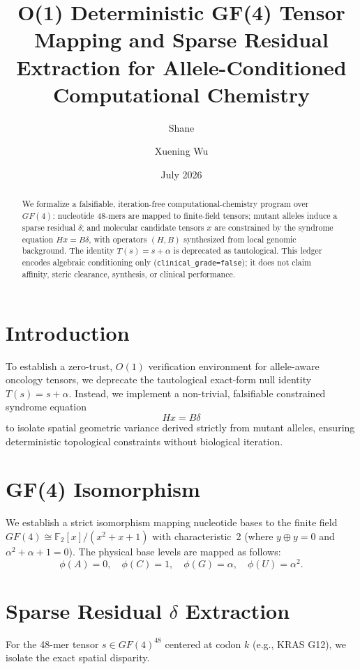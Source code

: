 \documentclass[11pt]{article}
\title{O(1) Deterministic GF(4) Tensor Mapping and Sparse Residual\\
Extraction for Allele-Conditioned Computational Chemistry}
\author{Shane \and Xuening Wu}
\date{July 2026}
\begin{document}
\maketitle

\begin{abstract}
We formalize a falsifiable, iteration-free computational-chemistry program
over \(GF(4)\): nucleotide 48-mers are mapped to finite-field tensors;
mutant alleles induce a sparse residual \(\delta\); and molecular candidate
tensors \(x\) are constrained by the syndrome equation \(Hx=B\delta\), with
operators \((H,B)\) synthesized from local genomic background. The identity
\(T(s)=s+\alpha\) is deprecated as tautological. This ledger encodes algebraic
conditioning only (\texttt{clinical\_grade=false}); it does not claim affinity,
steric clearance, synthesis, or clinical performance.
\end{abstract}

\section{Introduction}
To establish a zero-trust, \(O(1)\) verification environment for allele-aware
oncology tensors, we deprecate the tautological exact-form null identity
\(T(s)=s+\alpha\). Instead, we implement a non-trivial, falsifiable constrained
syndrome equation
\begin{equation}
  Hx = B\delta
\end{equation}
to isolate spatial geometric variance derived strictly from mutant alleles,
ensuring deterministic topological constraints without biological iteration.

\section{GF(4) Isomorphism}
We establish a strict isomorphism mapping nucleotide bases to the finite field
\(GF(4)\cong\mathbb{F}_2[x]/(x^2+x+1)\) with characteristic~2
(where \(y\oplus y=0\) and \(\alpha^2+\alpha+1=0\)). The physical base levels
are mapped as follows:
\begin{equation}
\phi(A)=0,\quad \phi(C)=1,\quad \phi(G)=\alpha,\quad \phi(U)=\alpha^2.
\end{equation}

\section{Sparse Residual \(\delta\) Extraction}
For the 48-mer tensor \(s\in GF(4)^{48}\) centered at codon \(k\)
(e.g., KRAS G12), we isolate the exact spatial disparity.
\end{document}
